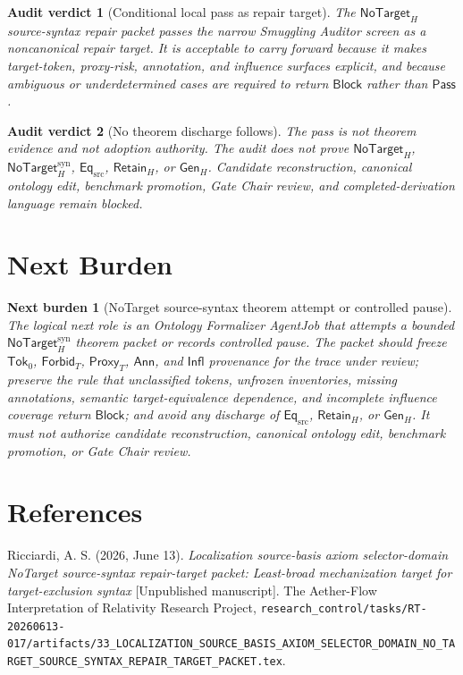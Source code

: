 \documentclass[11pt]{article}
\newcommand{\GenH}{\mathsf{Gen}_{H}}
\newcommand{\EqSrc}{\mathsf{Eq}_{\mathrm{src}}}
\newcommand{\RetainH}{\mathsf{Retain}_{H}}
\newcommand{\NoTargetH}{\mathsf{NoTarget}_{H}}
\newcommand{\NoTargetSyn}{\mathsf{NoTarget}_{H}^{\mathrm{syn}}}
\newcommand{\SrcTok}{\mathsf{Tok}_{0}}
\newcommand{\ForbidT}{\mathsf{Forbid}_{T}}
\newcommand{\ProxyT}{\mathsf{Proxy}_{T}}
\newcommand{\Annot}{\mathsf{Ann}}
\newcommand{\Influence}{\mathsf{Infl}}
\newcommand{\Pass}{\mathsf{Pass}}
\newcommand{\Block}{\mathsf{Block}}
\newtheorem{auditverdict}{Audit verdict}
\newtheorem{nextburden}{Next burden}
\begin{document}
\begin{auditverdict}[Conditional local pass as repair target]
The \(\NoTargetH\) source-syntax repair packet passes the narrow Smuggling
Auditor screen as a noncanonical repair target. It is acceptable to carry
forward because it makes target-token, proxy-risk, annotation, and influence
surfaces explicit, and because ambiguous or underdetermined cases are
required to return \(\Block\) rather than \(\Pass\).
\end{auditverdict}

\begin{auditverdict}[No theorem discharge follows]
The pass is not theorem evidence and not adoption authority. The audit does
not prove \(\NoTargetH\), \(\NoTargetSyn\), \(\EqSrc\), \(\RetainH\), or
\(\GenH\). Candidate reconstruction, canonical ontology edit, benchmark
promotion, Gate Chair review, and completed-derivation language remain
blocked.
\end{auditverdict}

\section{Next Burden}

\begin{nextburden}[NoTarget source-syntax theorem attempt or controlled pause]
The logical next role is an Ontology Formalizer AgentJob that attempts a
bounded \(\NoTargetSyn\) theorem packet or records controlled pause. The
packet should freeze \(\SrcTok\), \(\ForbidT\), \(\ProxyT\), \(\Annot\), and
\(\Influence\) provenance for the trace under review; preserve the rule that
unclassified tokens, unfrozen inventories, missing annotations, semantic
target-equivalence dependence, and incomplete influence coverage return
\(\Block\); and avoid any discharge of \(\EqSrc\), \(\RetainH\), or
\(\GenH\). It must not authorize candidate reconstruction, canonical
ontology edit, benchmark promotion, or Gate Chair review.
\end{nextburden}

\section*{References}

Ricciardi, A. S. (2026, June 13). \emph{Localization source-basis axiom
selector-domain NoTarget source-syntax repair-target packet: Least-broad
mechanization target for target-exclusion syntax} [Unpublished manuscript].
The Aether-Flow Interpretation of Relativity Research Project,
\texttt{research\_control/tasks/RT-20260613-017/artifacts/33\_LOCALIZATION\_SOURCE\_BASIS\_AXIOM\_SELECTOR\_DOMAIN\_NO\_TARGET\_SOURCE\_SYNTAX\_REPAIR\_TARGET\_PACKET.tex}.
\end{document}
